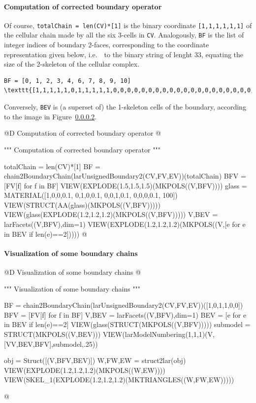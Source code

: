 \documentclass[11pt,oneside]{article}    %
\begin{document}
\paragraph{Computation of corrected boundary operator}
Of course, \texttt{totalChain = len(CV)*[1]} is the binary coordinate \texttt{[1,1,1,1,1,1]}
of the cellular chain made by all the six 3-cells in \texttt{CV}.
Analogously, \texttt{BF} is the list of integer indices of boundary 2-faces, corresponding to the coordinate representation given below, i.e.~~to the binary string of lenght 33, equating the size of the 2-skeleton of the cellular complex.
\begin{verbatim}
BF = [0, 1, 2, 3, 4, 6, 7, 8, 9, 10]
\texttt{[1,1,1,1,1,0,1,1,1,1,1,0,0,0,0,0,0,0,0,0,0,0,0,0,0,0,0,0,0,0,0,0,0]}
\end{verbatim}
Conversely, \texttt{BEV} is (a superset of) the 1-skeleton cells of the boundary, according to the image in Figure~\ref{}.

@D Computation of corrected boundary operator
@{""" Computation of corrected boundary operator """

totalChain = len(CV)*[1]
BF = chain2BoundaryChain(larUnsignedBoundary2(CV,FV,EV))(totalChain)
BFV = [FV[f] for f in BF]
VIEW(EXPLODE(1.5,1.5,1.5)(MKPOLS((V,BFV))))
glass = MATERIAL([1,0,0,0.1,  0,1,0,0.1,  0,0,1,0.1, 0,0,0,0.1, 100])
VIEW(STRUCT(AA(glass)(MKPOLS((V,BFV)))))
VIEW(glass(EXPLODE(1.2,1.2,1.2)(MKPOLS((V,BFV)))))
V,BEV = larFacets((V,BFV),dim=1)
VIEW(EXPLODE(1.2,1.2,1.2)(MKPOLS((V,[e for e in BEV if len(e)==2]))))
@}

\paragraph{Visualization of some boundary chains}
@D Visualization of some boundary chains
@{""" Visualization of some boundary chains """

BF = chain2BoundaryChain(larUnsignedBoundary2(CV,FV,EV))([1,0,1,1,0,0])
BFV = [FV[f] for f in BF]
V,BEV = larFacets((V,BFV),dim=1)
BEV = [e for e in BEV if len(e)==2]
VIEW(glass(STRUCT(MKPOLS((V,BFV)))))
submodel = STRUCT(MKPOLS((V,BEV)))
VIEW(larModelNumbering(1,1,1)(V,[VV,BEV,BFV],submodel,.25)) 


obj = Struct([(V,BFV,BEV)])
W,FW,EW = struct2lar(obj)
VIEW(EXPLODE(1.2,1.2,1.2)(MKPOLS((W,EW))))
VIEW(SKEL_1(EXPLODE(1.2,1.2,1.2)(MKTRIANGLES((W,FW,EW)))))

@}
\end{document}

